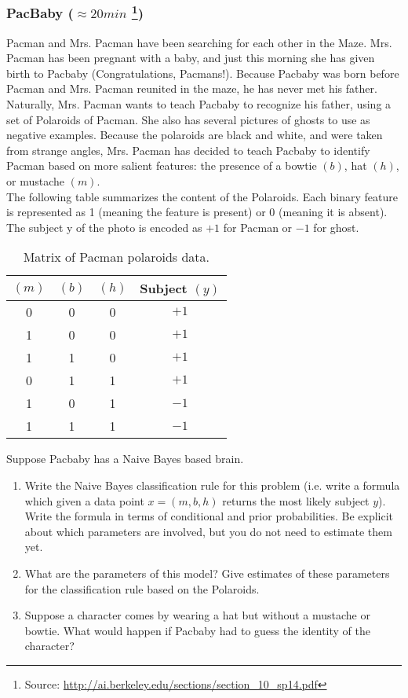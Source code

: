 \documentclass[a4paper, 10pt]{article}
\begin{document}
\subsubsection{PacBaby ($\approx 20 min$ \protect\footnote{Source: \url{http://ai.berkeley.edu/sections/section\_10\_sp14.pdf}})}
Pacman and Mrs. Pacman have been searching for each other in the Maze. Mrs. Pacman has been pregnant with a
baby, and just this morning she has given birth to Pacbaby (Congratulations, Pacmans!).
Because Pacbaby was born before Pacman and Mrs. Pacman reunited in the maze, he has never met his father.
Naturally, Mrs. Pacman wants to teach Pacbaby to recognize his father, using a set of Polaroids of Pacman. She also has several pictures of ghosts to use as negative examples.
Because the polaroids are black and white, and were taken from strange angles, Mrs. Pacman has decided to teach
Pacbaby to identify Pacman based on more salient features: the presence of a bowtie $(b)$, hat $(h)$, or mustache $(m)$.\\
The following table summarizes the content of the Polaroids. Each binary feature is represented as 1 (meaning the feature is present) or 0 (meaning it is absent). The subject y of the photo is encoded as $+1$ for Pacman or $-1$ for ghost.
\begin{table}[H]
    \centering
    \begin{tabular}{|ccc|c|}
        \hline
        $(m)$ &  $(b)$ & $(h)$ & Subject $(y)$\\\hline
        0 & 0 & 0 & $+1$\\
        1 & 0 & 0 & $+1$\\
        1 & 1 & 0 & $+1$\\
        0 & 1 & 1 & $+1$\\
        1 & 0 & 1 & $-1$\\
        1 & 1 & 1 & $-1$\\\hline
    \end{tabular}
    \caption{Matrix of Pacman polaroids data.}
    \label{tab:pacman}
\end{table}
Suppose Pacbaby has a Naive Bayes based brain.
\begin{enumerate}
    \item Write the Naive Bayes classification rule for this problem (i.e. write a formula which given a data point $x = (m, b, h)$ returns the most likely subject $y$). Write the formula in terms of conditional and prior probabilities. Be explicit about which parameters are involved, but you do not need to estimate them yet.
    \item What are the parameters of this model? Give estimates of these parameters for the classification rule based on the Polaroids.
    \item Suppose a character comes by wearing a hat but without a mustache or bowtie. What would happen if Pacbaby had to guess the identity of the character?
\end{enumerate}
\end{document}

